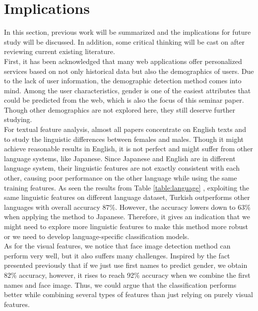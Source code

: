 \documentclass[runningheads]{llncs}
\begin{document}
	\section{Implications}
	
	In this section, previous work will be summarized and the implications for future study will be discussed. In addition, some critical thinking will be cast on after reviewing current existing literature. \\
	
	First, it has been acknowledged that many web applications offer personalized services based on not only historical data but also the demographics of users. Due to the lack of user information, the demographic detection method comes into mind. Among the user characteristics, gender is one of the easiest attributes that could be predicted from the web, which is also the focus of this seminar paper. Though other demographics are not explored here, they still deserve further studying. \\
	
	For textual feature analysis, almost all papers concentrate on English texts and to study the linguistic differences between females and males. Though it might achieve reasonable results in English, it is not perfect and might suffer from other language systems, like Japanese. Since Japanese and English are in different language system, their linguistic features are not exactly consistent with each other, causing poor performance on the other language while using the same training features. As seen the results from Table \ref{table:language} \cite{ciot2013gender}, exploiting the same linguistic features on different language dataset, Turkish outperforms other languages with overall accuracy 87\%. However, the accuracy lowers down to 63\% when applying the method to Japanese. Therefore, it gives an indication that we might need to explore more linguistic features to make this method more robust or we need to develop language-specific classification models. \\
	
	As for the visual features, we notice that face image detection method can perform very well, but it also suffers many challenges. Inspired by the fact presented previously that if we just use first names to predict gender, we obtain 82\% accuracy, however, it rises to reach 92\% accuracy when we combine the first names and face image. Thus, we could argue that the classification performs better while combining several types of features than just relying on purely visual features. \\
	
\end{document}
